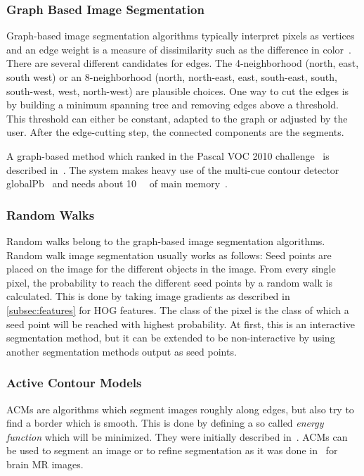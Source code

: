 \subsubsection{Graph Based Image Segmentation}%
\label{subsec:graph-based-image-segmentation}%
Graph-based image segmentation algorithms typically interpret pixels as
vertices and an edge weight is a measure of dissimilarity such as the
difference in color~\cite{felzenszwalb2004efficient,FelzenszwalbGraphCode}.
There are several different candidates for edges. The 4-neighborhood (north,
east, south west) or an 8-neighborhood (north, north-east, east, south-east,
south, south-west, west, north-west) are plausible choices.
One way to cut the edges is by building a minimum spanning tree and removing
edges above a threshold. This threshold can either be constant, adapted to the
graph or adjusted by the user. After the edge-cutting step, the connected
components are the segments.

A graph-based method which ranked  in the Pascal VOC 2010
challenge~\cite{everingham2010pascal} is described
in~\cite{carreira2010constrained}. The system makes heavy use of the multi-cue
contour detector globalPb~\cite{4587420} and needs about \SI{10}{\giga\byte}
of main memory~\cite{Carreira2011}.


\subsubsection{Random Walks}

Random walks belong to the graph-based image segmentation algorithms. Random
walk image segmentation usually works as follows: Seed points are placed
on the image for the different objects in the image. From every single pixel,
the probability to reach the different seed points by a random walk is
calculated. This is done by taking image gradients as described in
\cref{subsec:features} for \gls{HOG} features. The class of the pixel is the
class of which a seed point will be reached with highest probability. At first,
this is an interactive segmentation method, but it can be extended to be
non-interactive by using another segmentation methods output as seed points.


\subsubsection{Active Contour Models}

\Glspl{ACM} are algorithms which segment images roughly along edges, but also
try to find a border which is smooth. This is done by defining a so called
\textit{energy function} which will be minimized. They were initially
described in~\cite{kass1988snakes}. \Glspl{ACM} can be used to segment an image
or to refine segmentation as it was done in~\cite{atkins1998fully} for brain
\gls{MR} images.


